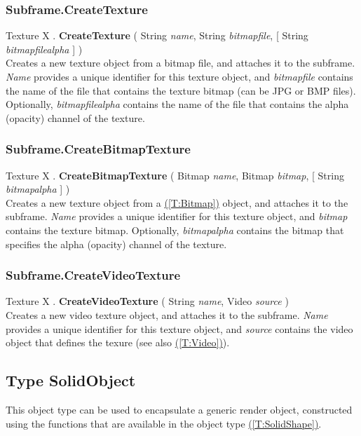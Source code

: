\documentclass[10pt]{book}
\newcommand{\linkitem}[1]{\hyperref[#1]{\nameref{#1} (\ref{#1})}}
\newcommand{\var}[1]{\textit{#1}}
\begin{document}
\subsubsection{Subframe.CreateTexture \label{F:Subframe:CreateTexture}}
Texture X . \textbf{CreateTexture} ( String \textit{name}, String \textit{bitmapfile},  [ String \textit{bitmapfilealpha} ] ) \\
Creates a new texture object from a bitmap file, and attaches it to the subframe. \var{Name} provides a unique identifier for this texture object, and \var{bitmapfile} contains the name of the file that contains the texture bitmap (can be JPG or BMP files). Optionally, \var{bitmapfilealpha} contains the name of the file that contains the alpha (opacity) channel of the texture.

\subsubsection{Subframe.CreateBitmapTexture \label{F:Subframe:CreateBitmapTexture}}
Texture X . \textbf{CreateBitmapTexture} ( Bitmap \textit{name}, Bitmap \textit{bitmap},  [ String \textit{bitmapalpha} ] ) \\
Creates a new texture object from a \linkitem{T:Bitmap} object, and attaches it to the subframe. \var{Name} provides a unique identifier for this texture object, and \var{bitmap} contains the texture bitmap. Optionally, \var{bitmapalpha} contains the bitmap that specifies the alpha (opacity) channel of the texture.


\subsubsection{Subframe.CreateVideoTexture \label{F:Subframe:CreateVideoTexture}}
Texture X . \textbf{CreateVideoTexture} ( String \textit{name}, Video \textit{source} ) \\
Creates a new video texture object, and attaches it to the subframe. \var{Name} provides a unique identifier for this texture object, and \var{source} contains the video object that defines the texure (see also \linkitem{T:Video}).


\subsection{Type SolidObject \label{T:SolidObject}}
This object type can be used to encapsulate a generic render object, constructed using the functions that are available in the object type \linkitem{T:SolidShape}.
\end{document}
